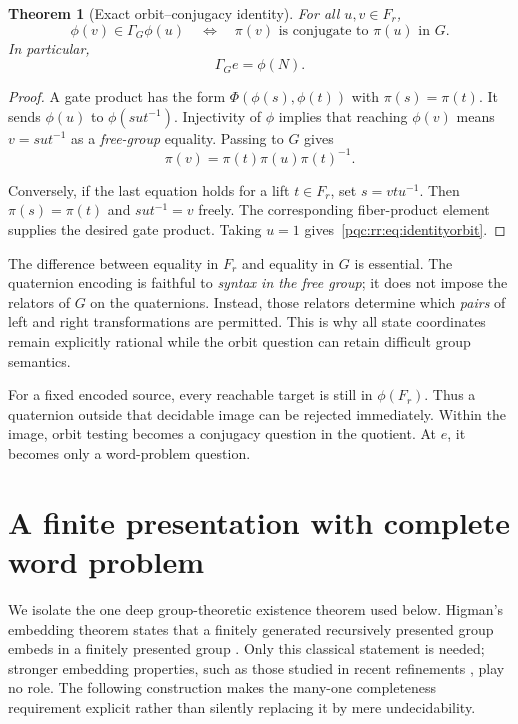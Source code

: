 \documentclass[11pt,letterpaper]{article}
\numberwithin{equation}{section}
\newtheorem{theorem}{Theorem}[section]
\theoremstyle{definition}
\theoremstyle{remark}
\newcommand{\srcmark}[1]{\par\noindent{\small\itshape [source~#1]}\par}
\begin{document}
\begin{theorem}[Exact orbit--conjugacy identity]\label{pqc:rr:thm:orbit}
For all $u,v\in F_r$,
\begin{equation}\label{pqc:rr:eq:orbitconj}
 \phi(v)\in\Gamma_G\phi(u)
 \quad\Longleftrightarrow\quad
 \pi(v)\text{ is conjugate to }\pi(u)\text{ in }G.
\end{equation}
In particular,
\begin{equation}\label{pqc:rr:eq:identityorbit}
 \Gamma_G e=\phi(N).
\end{equation}
\end{theorem}
\begin{proof}
A gate product has the form $\Phi(\phi(s),\phi(t))$ with
$\pi(s)=\pi(t)$. It sends $\phi(u)$ to $\phi(sut^{-1})$.
Injectivity of $\phi$ implies that reaching $\phi(v)$ means
$v=sut^{-1}$ as a \emph{free-group} equality. Passing to $G$ gives
\[
 \pi(v)=\pi(t)\pi(u)\pi(t)^{-1}.
\]

Conversely, if the last equation holds for a lift $t\in F_r$, set
$s=vtu^{-1}$. Then $\pi(s)=\pi(t)$ and $sut^{-1}=v$ freely.
The corresponding fiber-product element supplies the desired gate
product. Taking $u=1$ gives~\eqref{pqc:rr:eq:identityorbit}.
\end{proof}

The difference between equality in $F_r$ and equality in $G$ is essential.
The quaternion encoding is faithful to \emph{syntax in the free group};
it does not impose the relators of $G$ on the quaternions. Instead, those
relators determine which \emph{pairs} of left and right transformations
are permitted. This is why all state coordinates remain explicitly
rational while the orbit question can retain difficult group semantics.

For a fixed encoded source, every reachable target is still in
$\phi(F_r)$. Thus a quaternion outside that decidable image can be rejected
immediately. Within the image, orbit testing becomes a conjugacy question
in the quotient. At $e$, it becomes only a word-problem question.
\section{A finite presentation with complete word problem}
\label{pqc:rr:sec:higman}
\srcmark{11}

We isolate the one deep group-theoretic existence theorem used below.
Higman's embedding theorem states that a finitely generated recursively
presented group embeds in a finitely presented group \cite{b62-higman}.
Only this classical statement is needed; stronger embedding properties,
such as those studied in recent refinements \cite{b62s11-Wagner}, play no role.
The following construction makes the many-one completeness requirement
explicit rather than silently replacing it by mere undecidability.
\end{document}
